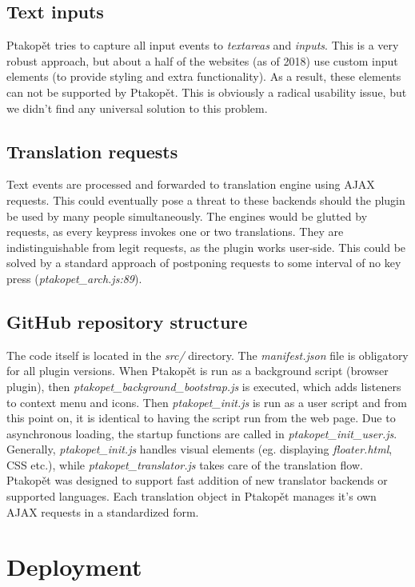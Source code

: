 \documentclass[a4paper]{article}
\begin{document}
\subsection{Text inputs}
Ptakopět tries to capture all input events to \textit{textareas} and \textit{inputs}. This is a very robust approach, but about a half of the websites (as of 2018) use custom input elements (to provide styling and extra functionality). As a result, these elements can not be supported by Ptakopět. This is obviously a radical usability issue, but we didn't find any universal solution to this problem.
\subsection{Translation requests}
Text events are processed and forwarded to translation engine using AJAX requests. This could eventually pose a threat to these backends should the plugin be used by many people simultaneously. The engines would be glutted by requests, as every keypress invokes one or two translations. They are indistinguishable from legit requests, as the plugin works user-side. This could be solved by a standard approach of postponing requests to some interval of no key press (\textit{ptakopet\_arch.js:89}).
\subsection{GitHub repository structure}
The code itself is located in the \textit{src/} directory. The \textit{manifest.json} file is obligatory for all plugin versions. When Ptakopět is run as a background script (browser plugin), then \textit{ptakopet\_background\_bootstrap.js} is executed, which adds listeners to context menu and icons. Then \textit{ptakopet\_init.js} is run as a user script and from this point on, it is identical to having the script run from the web page. Due to asynchronous loading, the startup functions are called in \textit{ptakopet\_init\_user.js}. Generally, \textit{ptakopet\_init.js} handles visual elements (eg. displaying \textit{floater.html}, CSS etc.), while \textit{ptakopet\_translator.js} takes care of the translation flow. Ptakopět was designed to support fast addition of new translator backends or supported languages. Each translation object in Ptakopět manages it's own AJAX requests in a standardized form.

\section{Deployment}
\end{document}
